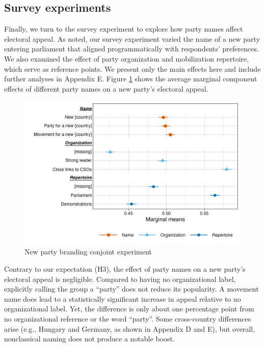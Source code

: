 \documentclass[12pt]{article}
\begin{document}
\subsection{Survey experiments}

Finally, we turn to the survey experiment to explore how party names affect electoral appeal. As noted, our survey experiment varied the name of a new party entering parliament that aligned programmatically with respondents' preferences. We also examined the effect of party organization and mobilization repertoire, which serve as reference points. We present only the main effects here and include further analyses in Appendix E. Figure \ref{conjoint1_main} shows the average marginal component effects of different party names on a new party's electoral appeal.

\begin{figure}[H] 
\includegraphics[width=\textwidth]{./figures/Figure5.png} 
\caption{New party branding conjoint experiment} 
\label{conjoint1_main} 
\end{figure}

Contrary to our expectation (H3), the effect of party names on a new party’s electoral appeal is negligible. Compared to having no organizational label, explicitly calling the group a ``party'' does not reduce its popularity. A movement name does lead to a statistically significant increase in appeal relative to no organizational label. Yet, the difference is only about one percentage point from no organizational reference or the word ``party''. Some cross-country differences arise (e.g., Hungary and Germany, as shown in Appendix D and E), but overall, nonclassical naming does not produce a notable boost.
\end{document}
